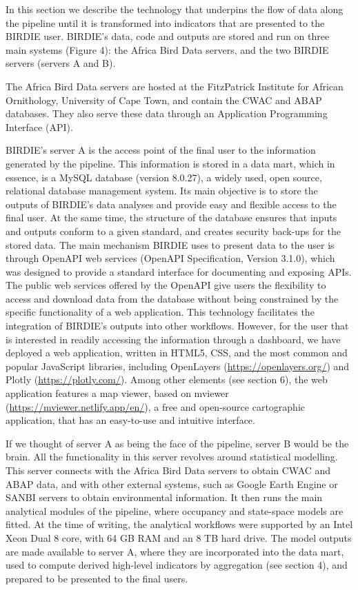 \documentclass[utf8]{frontiersSCNS}
\begin{document}
In this section we describe the technology that underpins the flow of
data along the pipeline until it is transformed into indicators that are
presented to the BIRDIE user. BIRDIE's data, code and outputs are stored
and run on three main systems (Figure 4): the Africa Bird Data servers,
and the two BIRDIE servers (servers A and B).

The Africa Bird Data servers are hosted at the FitzPatrick Institute for
African Ornithology, University of Cape Town, and contain the CWAC and
ABAP databases. They also serve these data through an Application
Programming Interface (API).

BIRDIE's server A is the access point of the final user to the
information generated by the pipeline. This information is stored in a
data mart, which in essence, is a MySQL database (version 8.0.27), a
widely used, open source, relational database management system. Its
main objective is to store the outputs of BIRDIE's data analyses and
provide easy and flexible access to the final user. At the same time,
the structure of the database ensures that inputs and outputs conform to
a given standard, and creates security back-ups for the stored data. The
main mechanism BIRDIE uses to present data to the user is through
OpenAPI web services (OpenAPI Specification, Version 3.1.0), which was
designed to provide a standard interface for documenting and exposing
APIs. The public web services offered by the OpenAPI give users the
flexibility to access and download data from the database without being
constrained by the specific functionality of a web application. This
technology facilitates the integration of BIRDIE's outputs into other
workflows. However, for the user that is interested in readily accessing
the information through a dashboard, we have deployed a web application,
written in HTML5, CSS, and the most common and popular JavaScript
libraries, including OpenLayers (\url{https://openlayers.org/}) and
Plotly (\url{https://plotly.com/}). Among other elements (see section
6), the web application features a map viewer, based on mviewer
(\url{https://mviewer.netlify.app/en/}), a free and open-source
cartographic application, that has an easy-to-use and intuitive
interface.

If we thought of server A as being the face of the pipeline, server B
would be the brain. All the functionality in this server revolves around
statistical modelling. This server connects with the Africa Bird Data
servers to obtain CWAC and ABAP data, and with other external systems,
such as Google Earth Engine or SANBI servers to obtain environmental
information. It then runs the main analytical modules of the pipeline,
where occupancy and state-space models are fitted. At the time of
writing, the analytical workflows were supported by an Intel Xeon Dual 8
core, with 64 GB RAM and an 8 TB hard drive. The model outputs are made
available to server A, where they are incorporated into the data mart,
used to compute derived high-level indicators by aggregation (see
section 4), and prepared to be presented to the final users.
\end{document}
